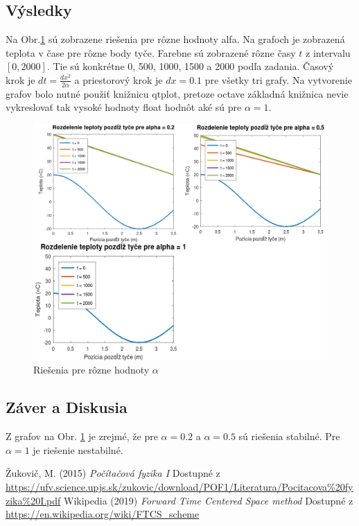 \documentclass{article}
\theoremstyle{definition}
\theoremstyle{remark}
\begin{document}
\subsection{Výsledky}
Na Obr.\ref{fig:ftcs} sú zobrazene riešenia pre rôzne hodnoty alfa. Na grafoch je zobrazená teplota v čase pre rôzne body tyče. Farebne sú zobrazené rôzne časy $t$ z intervalu $[0,2000]$. Tie sú konkrétne 0, 500, 1000, 1500 a 2000 podľa zadania. Časový krok je $dt = \frac{dx^2}{2\alpha}$ a priestorový krok je $dx = 0.1$ pre všetky tri grafy. Na vytvorenie grafov bolo nutné použiť knižnicu qtplot, pretoze octave základná knižnica nevie vykreslovať tak vysoké hodnoty float hodnôt aké sú pre $\alpha = 1$.
\begin{figure}[H]
    \centering
    \includegraphics[width=1\textwidth]{hw3pic_correct.png}
    \caption{Riešenia pre rôzne hodnoty $\alpha$}
    \label{fig:ftcs}
\end{figure}



\pagebreak

\subsection{Záver a Diskusia}
Z grafov na Obr. \ref{fig:ftcs} je zrejmé, že pre $\alpha = 0.2$ a $\alpha = 0.5$ sú riešenia stabilné. Pre $\alpha = 1$ je riešenie nestabilné. 

\begin{thebibliography}{99}

Žukovič, M. (2015) \emph{Počítačová fyzika I} Dostupné z \url{https://ufv.science.upjs.sk/zukovic/download/POF1/Literatura/Pocitacova%20fyzika%20I.pdf}
 Wikipedia (2019) \emph{Forward Time Centered Space method} Dostupné z \url{https://en.wikipedia.org/wiki/FTCS_scheme}
\end{thebibliography}
\end{document}
